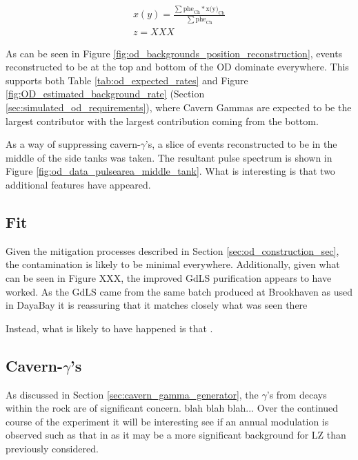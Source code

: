 \begin{equation}
    \begin{array}{lcl}
        x(y) = \frac{\sum{\text{phe}_\text{Ch} * \text{x(y)}_\text{Ch}}}{\sum{\text{phe}_\text{Ch}}} \\
        z = XXX 
    \end{array}
    \label{eq:OD_xy_position}
\end{equation}





\par
As can be seen in Figure \ref{fig:od_backgrounds_position_reconstruction}, events reconstructed to be at the top and bottom of the OD dominate everywhere.
This supports both Table \ref{tab:od_expected_rates} and Figure \ref{fig:OD_estimated_background_rate} (Section \ref{sec:simulated_od_requirements}), where Cavern Gammas are expected to be the largest contributor with the largest contribution coming from the bottom.


\par
As a way of suppressing cavern-$\gamma$'s, a slice of events reconstructed to be in the middle of the side tanks was taken.
The resultant pulse spectrum is shown in Figure \ref{fig:od_data_pulsearea_middle_tank}.
What is interesting is that two additional features have appeared.





\subsection{Fit}
\par
Given the mitigation processes described in Section \ref{sec:od_construction_sec}, the contamination is likely to be minimal everywhere. 
Additionally, given what can be seen in Figure XXX, the improved GdLS purification appears to have worked.
As the GdLS came from the same batch produced at Brookhaven as used in DayaBay it is reassuring that it matches closely what was seen there

\par
Instead, what is likely to have happened is that \cite{KamLAND_LS_contaminants_ref}.


\subsection{Cavern-$\gamma$'s}
\par
As discussed in Section \ref{sec:cavern_gamma_generator}, the $\gamma$'s from decays within the rock are of significant concern.
blah blah blah...
Over the continued course of the experiment it will be interesting see if an annual modulation is observed such as that in \cite{cavern_gamma_annual_modulation_CoGeNT_ref, cavern_gammas_in_Soudan_mine_ref} as it may be a more significant background for LZ than previously considered.